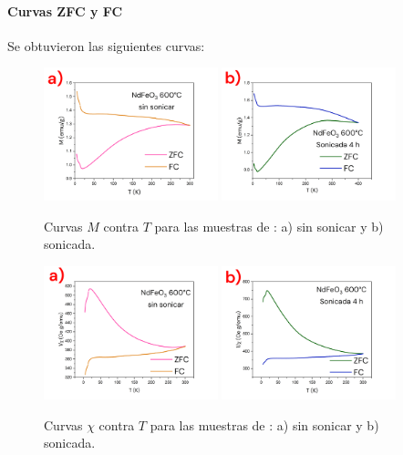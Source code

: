 \documentclass[../main.tex]{subfiles}
\begin{document}
\paragraph{Curvas ZFC y FC}
Se obtuvieron las siguientes curvas:
\begin{figure}[H]
    \centering
    \includegraphics[width=0.45\textwidth]{fig/MvTNd.png}
    \quad
    \includegraphics[width=0.45\textwidth]{fig/MvTNd-S.png}
    \caption{Curvas $M$ contra $T$ para las muestras de \neod{}: a) sin sonicar y b) sonicada.}
    \label{fig:MvTNd}
\end{figure}
\begin{figure}[H]
    \centering
    \includegraphics[width=0.45\textwidth]{fig/chivTNd.png}
    \quad
    \includegraphics[width=0.45\textwidth]{fig/chivTNd-S.png}
    \caption{Curvas $\chi$ contra $T$ para las muestras de \neod{}: a) sin sonicar y b) sonicada.}
    \label{fig:chivTNd}
\end{figure}
\end{document}
